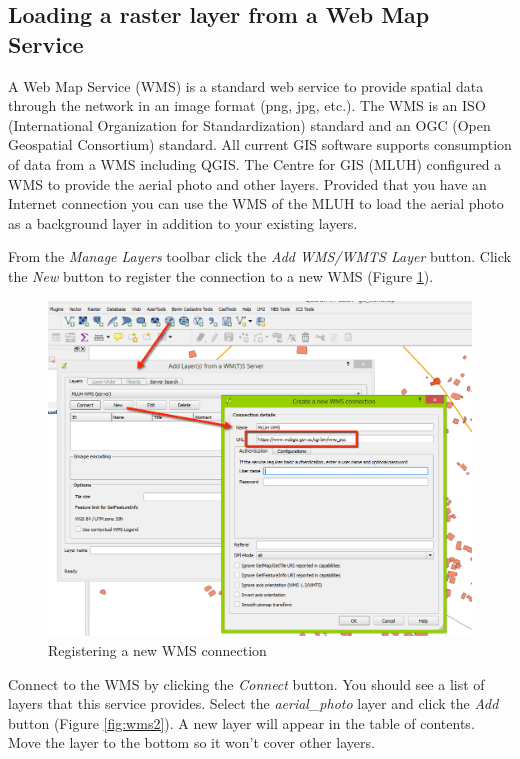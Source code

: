 \documentclass[a4paper,12pt,titlepage]{article}
\begin{document}
\subsection{Loading a raster layer from a Web Map Service}
A Web Map Service (WMS) is a standard web service to provide spatial data through the network in an image format (png, jpg, etc.). The WMS is an ISO (International Organization for Standardization) standard and an OGC (Open Geospatial Consortium) standard. All current GIS software supports consumption of data from a WMS including QGIS. The Centre for GIS (MLUH) configured a WMS to provide the aerial photo and other layers. Provided that you have an Internet connection you can use the WMS of the MLUH to load the aerial photo as a background layer in addition to your existing layers.

From the \textit{Manage Layers} toolbar click the \textit{Add WMS/WMTS Layer} button. Click the \textit{New} button to register the connection to a new WMS (Figure \ref{fig:wms}).

\begin{figure}[h]
\centering
\includegraphics[width=12cm]{Images/wms.png}
\caption{Registering a new WMS connection}\label{fig:wms}
\end{figure}

Connect to the WMS by clicking the \textit{Connect} button. You should see a list of layers that this service provides. Select the \textit{aerial\_photo} layer and click the \textit{Add} button (Figure \ref{fig:wms2}). A new layer will appear in the table of contents. Move the layer to the bottom so it won't cover other layers.
\end{document}
